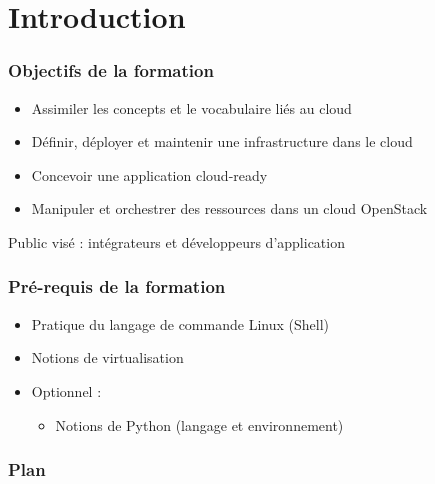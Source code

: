   \section*{Introduction}
  \begin{frame}
    \frametitle{Objectifs de la formation}
    \begin{itemize}
      \item Assimiler les concepts et le vocabulaire liés au cloud
      \item Définir, déployer et maintenir une infrastructure dans le cloud
      \item Concevoir une application cloud-ready
      \item Manipuler et orchestrer des ressources dans un cloud OpenStack
    \end{itemize}
    Public visé : intégrateurs et développeurs d'application
  \end{frame}

  \begin{frame}
    \frametitle{Pré-requis de la formation}
    \begin{itemize}
      \item Pratique du langage de commande Linux (Shell)
      \item Notions de virtualisation
      \item Optionnel :
      \begin{itemize}
        \item Notions de Python (langage et environnement)
      \end{itemize}
    \end{itemize}
  \end{frame}

  \begin{frame}
    \frametitle{Plan}
    \tableofcontents[hideallsubsections]
  \end{frame}
